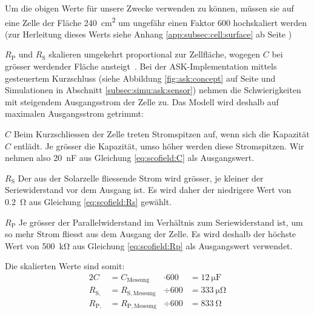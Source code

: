 Um die  obigen Werte f\"ur unsere  Zwecke verwenden zu k\"onnen,  m\"ussen sie
auf eine Zelle der Fl\"ache \SI{240}{\centi\meter\squared} um ungef\"ahr einen
Faktor \num{600} hochskaliert werden (zur Herleitung dieses Werts siehe Anhang
\ref{app:subsec:cell:surface} ab Seite \pageref{app:subsec:cell:surface})

$R_{\mathrm{P}}$   und  $R_{\mathrm{S}}$   skalieren  umgekehrt   proportional
zur   Zellfl\"ache,    wogegen   $C$   bei   gr\"osser    werdender   Fl\"ache
ansteigt~\cite{ref:solar:scofield}. Bei    der   ASK-Implementation    mittels
gesteuertem   Kurzschluss    (siehe   Abbildung    \ref{fig:ask:concept}   auf
Seite    \pageref{fig:ask:concept}     und    Simulationen     in    Abschnitt
\ref{subsec:simu:ask:sensor})  nehmen   die  Schwierigkeiten   mit  steigendem
Ausgangsstrom   der  Zelle   zu. Das   Modell  wird   deshalb  auf   maximalen
Ausgangsstrom getrimmt:

\begin{symbols}
    \firmlist
    \item[$C$]
        Beim Kurzschliessen der  Zelle treten Stromspitzen auf,  wenn sich die
        Kapazit\"at $C$ entl\"adt. Je gr\"osser  die Kapazit\"at, umso h\"oher
        werden diese  Stromspitzen.  Wir nehmen also  \SI{20}{\nano\farad} aus
        Gleichung \ref{eq:scofield:C} als Ausgangswert.
    \item[$R_{\mathrm{S}}$]
        Der aus der Solarzelle fliessende Strom wird gr\"osser, je kleiner der
        Seriewiderstand vor dem Ausgang ist. Es wird daher der niedrigere Wert
        von \SI{0.2}{\ohm} aus Gleichung \ref{eq:scofield:Rs} gew\"ahlt.
    \item[$R_{\mathrm{P}}$]
        Je    gr\"osser   der    Parallelwiderstand   im    Verh\"altnis   zum
        Seriewiderstand  ist, um  so mehr  Strom fliesst  aus dem  Ausgang der
        Zelle.  Es wird deshalb der h\"ochste Wert von \SI{500}{\kilo\ohm} aus
        Gleichung \ref{eq:scofield:Rp} als Ausgangswert verwendet.
\end{symbols}

Die skalierten Werte sind somit:
\begin{alignat}{2}
    C               &= C_{\mathrm{Messung}}    &\cdot 600 &= \SI{12}{\micro\farad} \\
    R_{\mathrm{S,}} &= R_{\mathrm{S, Messung}} &\div  600 &= \SI{333}{\micro\ohm}    \\
    R_{\mathrm{P,}} &= R_{\mathrm{P, Messung}} &\div  600 &= \SI{833}{\ohm}
\end{alignat}

